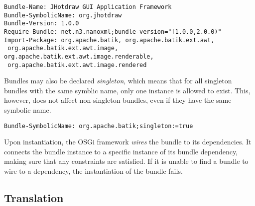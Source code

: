 \begin{lstlisting}[caption=Require-bundle and Import-package]
Bundle-Name: JHotdraw GUI Application Framework
Bundle-SymbolicName: org.jhotdraw
Bundle-Version: 1.0.0
Require-Bundle: net.n3.nanoxml;bundle-version="[1.0.0,2.0.0)"
Import-Package: org.apache.batik, org.apache.batik.ext.awt,
 org.apache.batik.ext.awt.image, org.apache.batik.ext.awt.image.renderable,
 org.apache.batik.ext.awt.image.rendered
\end{lstlisting}

Bundles may also be declared \textit{singleton}, which means that for all
singleton bundles with the same symblic name, only one instance is allowed to
exist. This, however, does not affect non-singleton bundles, even if they have
the same symbolic name.

\begin{lstlisting}[caption=Singleton Bundle]
Bundle-SymbolicName: org.apache.batik;singleton:=true
\end{lstlisting}

Upon instantiation, the OSGi framework \textit{wires} the bundle to its dependencies.
It connects the bundle instance to a specific instance of its bundle dependency, making
sure that any constraints are satisfied. If it is unable to find a bundle to wire to a
dependency, the instantiation of the bundle fails.

\subsection{Translation}


